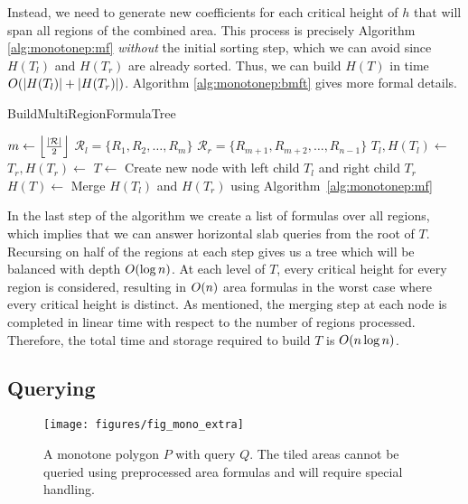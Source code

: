 Instead, we need to generate new coefficients for each critical height of $h$ that will span all regions of the combined area. This process is precisely Algorithm \ref{alg:monotonep:mf} \emph{without} the initial sorting step, which we can avoid since $H(T_l)$ and $H(T_r)$ are already sorted.  Thus, we can build $H(T)$ in time $O\!\left(|H(T_l)| + |H(T_r)|\right)$.  Algorithm \ref{alg:monotonep:bmft} gives more formal details.

\begin{algorithm}
\LinesNumbered
\DontPrintSemicolon
\caption{BuildMultiRegionFormulaTree}
\label{alg:monotonep:bmft}
\BlankLine
{}
$m \gets \left\lfloor\frac{|\mathcal{R}|}{2}\right\rfloor$\;
$\mathcal{R}_l = \{ R_1, R_2, \ldots, R_m \}$\;
$\mathcal{R}_r = \{ R_{m+1}, R_{m+2}, \ldots, R_{n-1} \}$\;
$T_l, H(T_l) \gets $ \;
$T_r, H(T_r) \gets $ \;
$T \gets $ Create new node with left child $T_l$ and right child $T_r$\;
$H(T) \gets $ Merge $H(T_l)$ and $H(T_r)$ using Algorithm~\ref{alg:monotonep:mf}\;
\BlankLine
{}
\end{algorithm}

In the last step of the algorithm we create a list of formulas over all regions, which implies that we can answer horizontal slab queries from the root of $T$. Recursing on half of the regions at each step gives us a tree which will be balanced with depth $O\!\left(\log{n}\right)$. At each level of $T$, every critical height for every region is considered, resulting in $O\!\left(n\right)$ area formulas in the worst case where every critical height is distinct. As mentioned, the merging step at each node is completed in linear time with respect to the number of regions processed. Therefore, the total time and storage required to build $T$ is $O\!\left(n\log{n}\right)$.  


\subsection{Querying}
\label{:monotonep:rect:querying}

\begin{figure}[t]
\begin{center}
  \texttt{[image: figures/fig\_mono\_extra]}
  \caption[Details of a query on a monotone polygon.]{A monotone polygon $P$ with query $Q$. The tiled areas cannot be queried using preprocessed area formulas and will require special handling.}
  \label{fig:monotonep:extra}
\end{center}
\end{figure}

